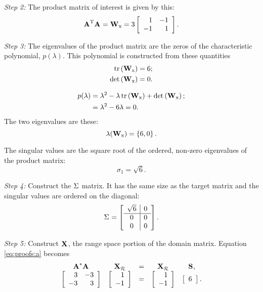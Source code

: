 \textit{Step 2:} The product matrix of interest is given by this:
\begin{equation}
  \prdm{T} = \W{x} = 3 \mat{rr}{1&-1\\-1&1}.
\end{equation}

\textit{Step 3:} The eigenvalues of the product matrix are the zeros of the characteristic polynomial, $p(\lambda)$. This polynomial is constructed from these quantities
\begin{equation}
  \begin{split}
    \tr \paren{\W{x}} & = 6;\\
    \det \paren{\W{x}}& = 0.
  \end{split}
\end{equation}

\begin{equation}
  \begin{split}
    p(\lambda) & = \lambda^{2} - \lambda \tr \paren{\W{x}} +\det \paren{\W{x}};\\
    &= \lambda^{2} - 6 \lambda = 0.
  \end{split}
\end{equation}
The two eigenvalues are these:
\begin{equation}
  \lambda(\W{x}) = \lst{6,0}.
\end{equation}

The singular values are the square root of the ordered, non-zero eigenvalues of the product matrix:
\begin{equation}
  \sigma_{1} = \sqrt{6}.
\end{equation}

\textit{Step 4:} Construct the $\sig{}$ matrix. It has the same size as the target matrix and the singular values are ordered on the diagonal:
\begin{equation}
  \sig{} = \Sigmaexampleb.
\end{equation}

\textit{Step 5:} Construct $\X{}_{}$, the range space portion of the domain matrix. Equation \eqref{eq:proofs:a} becomes
\begin{equation}
\begin{array}{ccccc}
  \prdm{*}&\xrng &=& \xrng&\ess{},\\
  \mat{rr}{3&-3\\-3&3}&\mat{r}{1\\-1} &=& \mat{r}{1\\-1} & \mat{c}{6}.
\end{array}
\end{equation}

